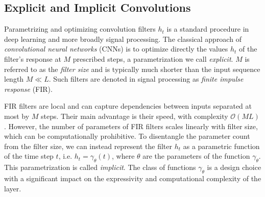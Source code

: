 \subsection{Explicit and Implicit Convolutions}
%
Parametrizing and optimizing convolution filters $h_t$ is a standard procedure in deep learning and more broadly signal processing. The classical approach of \textit{convolutional neural networks} (CNNs)  \citep{fukushima1982neocognitron,lecun1998gradient,ronneberger2015u,he2016deep} is to optimize directly the values $h_t$ of the filter's response at $M$ prescribed steps, a parametrization we call \textit{explicit}. $M$ is referred to as the \textit{filter size} and is typically much shorter than the input sequence length $M \ll L$. Such filters are denoted in signal processing as \textit{finite impulse response} (FIR). 

FIR filters are local and can capture dependencies between inputs separated at most by $M$ steps.
Their main advantage is their speed, with complexity $\mathcal{O}(ML)$. However, the number of parameters of FIR filters scales linearly with filter size, which can be computationally prohibitive. To disentangle the parameter count from the filter size, we can instead represent the filter $h_t$ as a parametric function of the time step $t$, i.e. $h_t = \gamma_\theta(t)$, where $\theta$ are the parameters of the function $\gamma_\theta$. This parametrization is called \textit{implicit}. The class of functions $\gamma_\theta$ is a design choice with a significant impact on the expressivity and computational complexity of the layer. 

